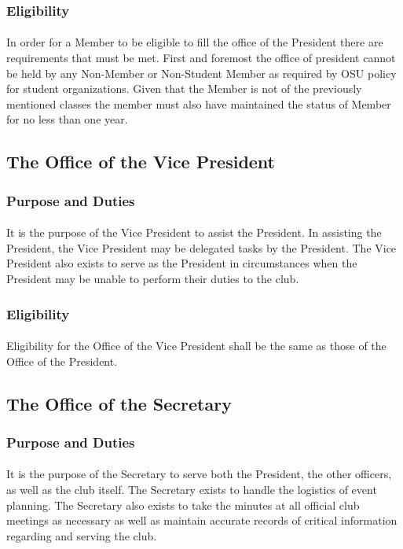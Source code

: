 \documentclass[12pt]{article}
\begin{document}
\subsubsection{Eligibility}
\paragraph{}
In order for a Member to be eligible to fill the office of the President there are requirements that must be met. First and foremost the office of president cannot be held by any Non-Member or Non-Student Member as required by OSU policy for student organizations. Given that the Member is not of the previously mentioned classes the member must also have maintained the status of Member for no less than one year. 

\subsection{The Office of the Vice President}
\subsubsection{Purpose and Duties}
\paragraph{}
It is the purpose of the Vice President to assist the President. In assisting the President, the Vice President may be delegated tasks by the President. The Vice President also exists to serve as the 
President in circumstances when the President may be unable to perform their duties to the club.
\subsubsection{Eligibility}
\paragraph{}
Eligibility for the Office of the Vice President shall be the same as those of the Office of the President.

\subsection{The Office of the Secretary}
\subsubsection{Purpose and Duties}
\paragraph{}
It is the purpose of the Secretary to serve both the President, the other officers, as well as the club itself. The Secretary exists to handle the logistics of event planning. The Secretary also exists
to take the minutes at all official club meetings as necessary as well as maintain accurate records of critical information regarding and serving the club.
\end{document}
